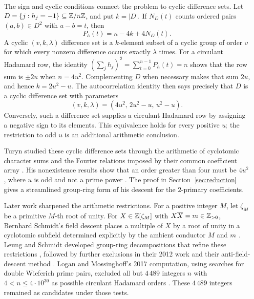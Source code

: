 The sign and cyclic conditions connect the problem to cyclic
difference sets. Let \(D=\{j:h_j=-1\}\subseteq\mathbb Z/n\mathbb Z\), and put
\(k=|D|\). If \(N_D(t)\) counts ordered pairs \((a,b)\in D^2\) with
\(a-b=t\), then
\[
 P_h(t)=n-4k+4N_D(t).
\]
A cyclic \((v,k,\lambda)\) difference set is a \(k\)-element subset
of a cyclic group of order \(v\) for which every nonzero difference
occurs exactly \(\lambda\) times. For a circulant Hadamard row, the identity
\((\sum_jh_j)^2=\sum_{t=0}^{n-1}P_h(t)=n\) shows that the row sum
is \(\pm2u\) when \(n=4u^2\). Complementing \(D\) when necessary
makes that sum \(2u\), and hence
\(k=2u^2-u\). The autocorrelation identity then says precisely that
\(D\) is a cyclic difference set with parameters
\[
 (v,k,\lambda)=(4u^2,\,2u^2-u,\,u^2-u).
\]
Conversely, such a difference set supplies a circulant Hadamard row
by assigning a negative sign to its elements. This equivalence holds
for every positive \(u\); the restriction to odd \(u\) is an additional
arithmetic conclusion.

Turyn studied these cyclic difference sets through the arithmetic of
cyclotomic character sums and the Fourier relations imposed by their
common coefficient array \cite[pp.~319--323]{Turyn1965}. His
nonexistence results show that an order greater than four must be
\(4u^2\), where \(u\) is odd and not a prime power
\cite[Corollary~2 to Theorem~6, p.~333, and Theorem~8 with its
Corollary, pp.~335--336]{Turyn1965}. The proof in
Section~\ref{sec:reduction} gives a streamlined group-ring form of
his descent for the \(2\)-primary coefficients.

Later work sharpened the arithmetic restrictions. For a positive
integer \(M\), let \(\zeta_M\) be a primitive \(M\)-th root of unity.
For \(X\in\mathbb Z[\zeta_M]\) with \(X\overline X=m\in\mathbb Z_{>0}\),
Bernhard Schmidt's field descent places a multiple of \(X\) by a root
of unity in a cyclotomic subfield determined explicitly by the ambient
conductor \(M\) and \(m\) \cite{Schmidt1999}. Leung and Schmidt
developed group-ring decompositions that refine these restrictions
\cite{LeungSchmidt2005}, followed by further exclusions in their
2012 work and their anti-field-descent method
\cite{LeungSchmidt2012,LeungSchmidt2016}. Logan and Mossinghoff's
2017 computation, using searches for double Wieferich prime pairs,
excluded all but \(4\,489\) integers \(n\) with
\(4<n\leq4\cdot10^{30}\) as possible circulant Hadamard orders
\cite{LoganMossinghoff2017}. These \(4\,489\) integers remained
as candidates under those tests.

